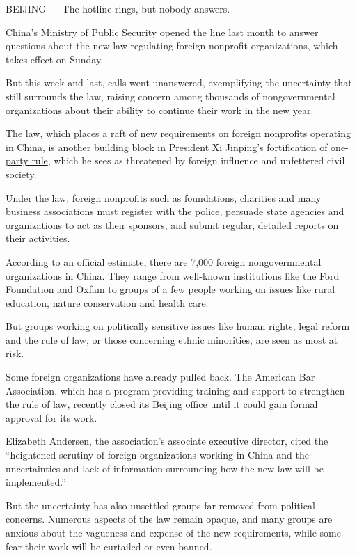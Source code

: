 BEIJING --- The hotline rings, but nobody answers.

China's Ministry of Public Security opened the line last month to answer
questions about the new law regulating foreign nonprofit organizations,
which takes effect on Sunday.

But this week and last, calls went unanswered, exemplifying the
uncertainty that still surrounds the law, raising concern among
thousands of nongovernmental organizations about their ability to
continue their work in the new year.

The law, which places a raft of new requirements on foreign nonprofits
operating in China, is another building block in President Xi Jinping's
\href{http://www.nytimes3xbfgragh.onion/2016/10/28/world/asia/xi-jinping-china.html}{fortification
of one-party rule}, which he sees as threatened by foreign influence and
unfettered civil society.

Under the law, foreign nonprofits such as foundations, charities and
many business associations must register with the police, persuade state
agencies and organizations to act as their sponsors, and submit regular,
detailed reports on their activities.

According to an official estimate, there are 7,000 foreign
nongovernmental organizations in China. They range from well-known
institutions like the Ford Foundation and Oxfam to groups of a few
people working on issues like rural education, nature conservation and
health care.

But groups working on politically sensitive issues like human rights,
legal reform and the rule of law, or those concerning ethnic minorities,
are seen as most at risk.

Some foreign organizations have already pulled back. The American Bar
Association, which has a program providing training and support to
strengthen the rule of law, recently closed its Beijing office until it
could gain formal approval for its work.

Elizabeth Andersen, the association's associate executive director,
cited the ``heightened scrutiny of foreign organizations working in
China and the uncertainties and lack of information surrounding how the
new law will be implemented.''

But the uncertainty has also unsettled groups far removed from political
concerns. Numerous aspects of the law remain opaque, and many groups are
anxious about the vagueness and expense of the new requirements, while
some fear their work will be curtailed or even banned.

